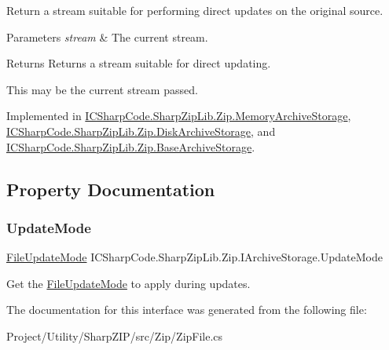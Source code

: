 Return a stream suitable for performing direct updates on the original source. 


\begin{DoxyParams}{Parameters}
{\em stream} & The current stream.\\
\hline
\end{DoxyParams}
\begin{DoxyReturn}{Returns}
Returns a stream suitable for direct updating.
\end{DoxyReturn}


This may be the current stream passed.

Implemented in \hyperlink{class_i_c_sharp_code_1_1_sharp_zip_lib_1_1_zip_1_1_memory_archive_storage_af536ce3c423efbc86e645382bc588deb}{I\+C\+Sharp\+Code.\+Sharp\+Zip\+Lib.\+Zip.\+Memory\+Archive\+Storage}, \hyperlink{class_i_c_sharp_code_1_1_sharp_zip_lib_1_1_zip_1_1_disk_archive_storage_afa463d93f03caa3af6e4ea89a1314a99}{I\+C\+Sharp\+Code.\+Sharp\+Zip\+Lib.\+Zip.\+Disk\+Archive\+Storage}, and \hyperlink{class_i_c_sharp_code_1_1_sharp_zip_lib_1_1_zip_1_1_base_archive_storage_a2e718c69eceae215d38d997e7b0d3693}{I\+C\+Sharp\+Code.\+Sharp\+Zip\+Lib.\+Zip.\+Base\+Archive\+Storage}.



\subsection{Property Documentation}
\mbox{\label{interface_i_c_sharp_code_1_1_sharp_zip_lib_1_1_zip_1_1_i_archive_storage_ab33a000171ef06349c3d739bb63e1fe2}} 
\subsubsection{\texorpdfstring{Update\+Mode}{UpdateMode}}
{\footnotesize\ttfamily \hyperlink{namespace_i_c_sharp_code_1_1_sharp_zip_lib_1_1_zip_a626313bc452203ca2bdb092947541027}{File\+Update\+Mode} I\+C\+Sharp\+Code.\+Sharp\+Zip\+Lib.\+Zip.\+I\+Archive\+Storage.\+Update\+Mode\hspace{0.3cm}{\ttfamily [get]}}



Get the \hyperlink{namespace_i_c_sharp_code_1_1_sharp_zip_lib_1_1_zip_a626313bc452203ca2bdb092947541027}{File\+Update\+Mode} to apply during updates. 



The documentation for this interface was generated from the following file\+:\begin{DoxyCompactItemize}
\item 
Project/\+Utility/\+Sharp\+Z\+I\+P/src/\+Zip/Zip\+File.\+cs\end{DoxyCompactItemize}
